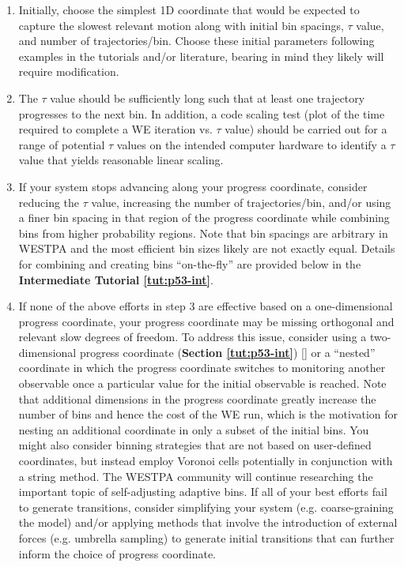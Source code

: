\begin{enumerate}
\item Initially, choose the simplest 1D coordinate that would be expected to capture the slowest relevant motion along with initial bin spacings, $\tau$ value, and number of trajectories/bin. 
Choose these initial parameters following examples in the tutorials and/or literature, bearing in mind they likely will require modification.
\item The $\tau$ value should be sufficiently long such that at least one trajectory progresses to the next bin. 
In addition, a code scaling test (plot of the time required to complete a WE iteration vs. $\tau$ value) should be carried out for a range of potential $\tau$ values on the intended computer hardware to identify a $\tau$ value that yields reasonable linear scaling. 
\pagebreak
\item If your system stops advancing along your progress coordinate, consider reducing the $\tau$ value, increasing the number of trajectories/bin, and/or using a finer bin spacing in that region of the progress coordinate while combining bins from higher probability regions. 
Note that bin spacings are arbitrary in WESTPA and the most efficient bin sizes likely are not exactly equal. 
Details for combining and creating bins “on-the-fly” are provided below in the \textbf{Intermediate Tutorial \ref{tut:p53-int}}. 
\item If none of the above efforts in step 3 are effective based on a one-dimensional progress coordinate, your progress coordinate may be missing orthogonal and relevant slow degrees of freedom. 
To address this issue, consider using a two-dimensional progress coordinate (\textbf{Section \ref{tut:p53-int}}) [\citep{saglam_proteinprotein_2019,zwier_efficient_2016}] or a “nested” coordinate in which the progress coordinate switches to monitoring another observable once a particular value for the initial observable is reached. 
Note that additional dimensions in the progress coordinate greatly increase the number of bins and hence the cost of the WE run, which is the motivation for nesting an additional coordinate in only a subset of the initial bins. 
You might also consider binning strategies that are not based on user-defined coordinates, but instead employ Voronoi cells potentially in conjunction with a string method. 
The WESTPA community will continue researching the important topic of self-adjusting adaptive bins. 
If all of your best efforts fail to generate transitions, consider simplifying your system (e.g. coarse-graining the model) and/or applying methods that involve the introduction of external forces (e.g. umbrella sampling) to generate initial transitions that can further inform the choice of progress coordinate.
\end{enumerate}

